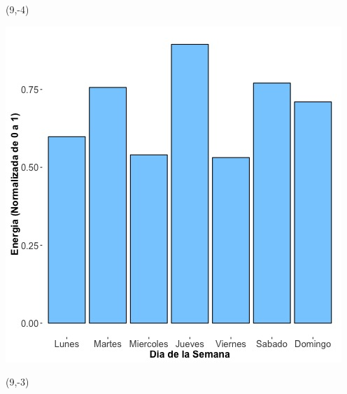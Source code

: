 \documentclass{article}\usepackage[]{graphicx}\usepackage[]{color}
\newenvironment{knitrout}{}{} %
\begin{document}
 \begin{textblock}{1}(9,-4)
\begin{minipage}{20em}
\begingroup

\endgroup
\end{minipage}
\end{textblock}


\begin{knitrout}
\color{fgcolor}
\includegraphics[scale=0.65]{figure/A20_day_of_week_plot} 
\end{knitrout}


 \begin{textblock}{1}(9,-3)
\begin{minipage}{20em}
\begingroup

\endgroup
\end{minipage}
\end{textblock}

 \vspace{2cm}
\end{document}
